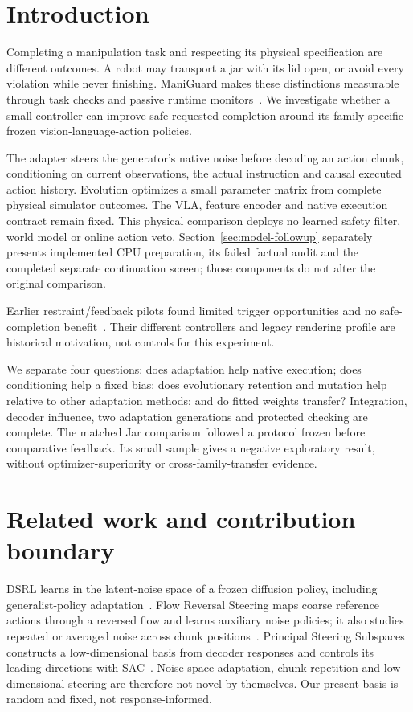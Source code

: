 \documentclass[sigconf,dvipsnames,balance=false]{acmart}
\begin{document}
\section{Introduction}
Completing a manipulation task and respecting its physical specification are
different outcomes. A robot may transport a jar with its lid open, or avoid every
violation while never finishing. ManiGuard makes these distinctions measurable
through task checks and passive runtime monitors~\cite{maniguard}. We investigate
whether a small controller can improve safe requested completion around its
family-specific frozen vision-language-action policies.

The adapter steers the generator's native noise before decoding an action chunk,
conditioning on current observations, the actual instruction and causal executed
action history. Evolution optimizes a small parameter matrix from complete
physical simulator outcomes. The VLA, feature encoder and native execution contract
remain fixed. This physical comparison deploys no learned safety filter, world
model or online action veto. Section~\ref{sec:model-followup} separately presents
implemented CPU preparation, its failed factual audit and the completed separate
continuation screen; those components do not alter the original comparison.

Earlier restraint/feedback pilots found limited trigger opportunities and no
safe-completion benefit~\cite{priorpilot}. Their different controllers and legacy
rendering profile are historical motivation, not controls for this experiment.

We separate four questions: does adaptation help native execution; does
conditioning help a fixed bias; does evolutionary retention and mutation help
relative to other adaptation methods; and do fitted weights transfer? Integration,
decoder influence, two adaptation generations and protected checking are complete.
The matched Jar comparison followed a protocol frozen before comparative feedback.
Its small sample gives a negative exploratory result, without optimizer-superiority
or cross-family-transfer evidence.

\section{Related work and contribution boundary}
DSRL learns in the latent-noise space of a frozen diffusion policy, including
generalist-policy adaptation~\cite{dsrl}. Flow Reversal Steering maps coarse
reference actions through a reversed flow and learns auxiliary noise policies;
it also studies repeated or averaged noise across chunk positions~\cite{frs}.
Principal Steering Subspaces constructs a low-dimensional basis from decoder
responses and controls its leading directions with SAC~\cite{pss}. Noise-space
adaptation, chunk repetition and low-dimensional steering are therefore not novel
by themselves. Our present basis is random and fixed, not response-informed.
\end{document}
